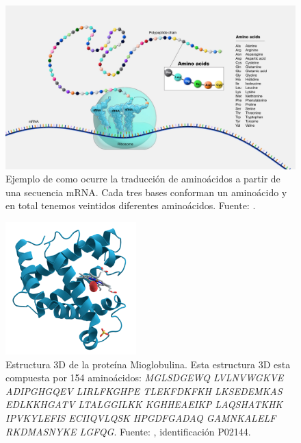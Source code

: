 \begin{figure}[H]
	\centering\includegraphics[width=\textwidth]{../img/proposal/amino-acids}
	\caption[Ejemplo de traducción de aminoácidos]{Ejemplo de como ocurre la traducción de aminoácidos a partir de una secuencia mRNA. Cada tres bases conforman un aminoácido y en total tenemos veintidos diferentes aminoácidos. Fuente: \cite{nih_aminoacids_2024}.}
	\label{fig:aminoacids}
\end{figure}



\begin{figure}[H]
	\centering\includegraphics[width=0.45\textwidth]{../img/proposal/myoglobin}
	\caption[Estructura 3D de la proteína Mioglobulina]{Estructura 3D de la proteína Mioglobulina. Esta estructura 3D esta compuesta por 154 aminoácidos: \textit{MGLSDGEWQ LVLNVWGKVE ADIPGHGQEV LIRLFKGHPE TLEKFDKFKH LKSEDEMKAS EDLKKHGATV LTALGGILKK KGHHEAEIKP LAQSHATKHK IPVKYLEFIS ECIIQVLQSK HPGDFGADAQ GAMNKALELF RKDMASNYKE LGFQG}. Fuente: \cite{uniprotkb}, identificación P02144.}
	\label{fig:myoglobin}
\end{figure}

